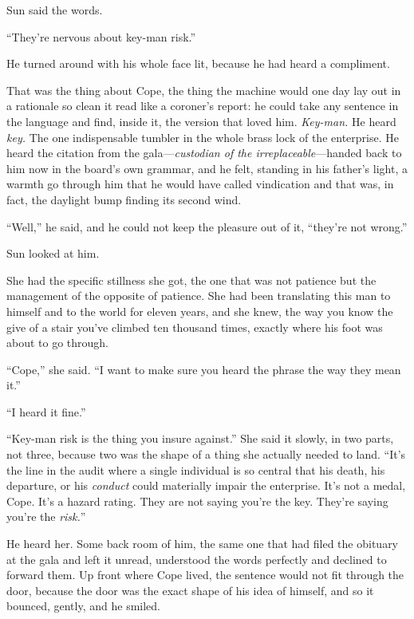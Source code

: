 \documentclass[11pt,openany]{book}
\newcommand{\scenebreak}{\par\vspace{0.5\baselineskip}\begin{center}\textasteriskcentered\quad\textasteriskcentered\quad\textasteriskcentered\end{center}\vspace{0.5\baselineskip}\par}
\begin{document}
Sun said the words.

``They're nervous about key-man risk.''


\scenebreak


He turned around with his whole face lit, because he had heard a compliment.

That was the thing about Cope, the thing the machine would one day lay out in a rationale so clean it read like a coroner's report: he could take any sentence in the language and find, inside it, the version that loved him. \textit{Key-man.} He heard \textit{key.} The one indispensable tumbler in the whole brass lock of the enterprise. He heard the citation from the gala---\textit{custodian of the irreplaceable}---handed back to him now in the board's own grammar, and he felt, standing in his father's light, a warmth go through him that he would have called vindication and that was, in fact, the daylight bump finding its second wind.

``Well,'' he said, and he could not keep the pleasure out of it, ``they're not wrong.''

Sun looked at him.

She had the specific stillness she got, the one that was not patience but the management of the opposite of patience. She had been translating this man to himself and to the world for eleven years, and she knew, the way you know the give of a stair you've climbed ten thousand times, exactly where his foot was about to go through.

``Cope,'' she said. ``I want to make sure you heard the phrase the way they mean it.''

``I heard it fine.''

``Key-man risk is the thing you insure against.'' She said it slowly, in two parts, not three, because two was the shape of a thing she actually needed to land. ``It's the line in the audit where a single individual is so central that his death, his departure, or his \textit{conduct} could materially impair the enterprise. It's not a medal, Cope. It's a hazard rating. They are not saying you're the key. They're saying you're the \textit{risk.}''

He heard her. Some back room of him, the same one that had filed the obituary at the gala and left it unread, understood the words perfectly and declined to forward them. Up front where Cope lived, the sentence would not fit through the door, because the door was the exact shape of his idea of himself, and so it bounced, gently, and he smiled.
\end{document}
